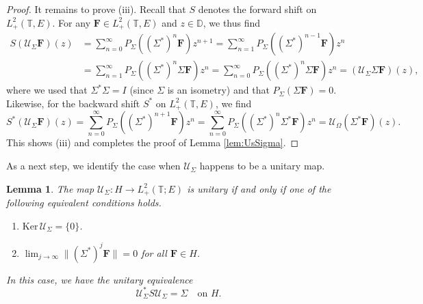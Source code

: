 \documentclass[10pt,reqno,a4paper]{amsart}
\newtheorem{lem}{Lemma}[section]
\theoremstyle{definition}
\theoremstyle{remark}
\theoremstyle{remark}
\numberwithin{equation}{section}
\newcommand{\T}{\mathbb{T}}
\newcommand{\D}{\mathbb{D}}
\renewcommand{\ker}{\mathrm{Ker}}
\newcommand{\Fb}{\mathbf{F}}
\newcommand{\id}{I}
\newcommand{\Om}{\Omega}
\newcommand{\Us}{\mathscr{U}}
\begin{document}
\begin{proof}
It remains to prove (iii). Recall that $S$ denotes the forward shift on $L^2_+(\T,E)$. For any $\Fb \in L^2_+(\T,E)$ and $z \in \D$, we thus find
\begin{align*}
S (\Us_\Sigma \Fb)(z) & = \sum_{n=0}^\infty P_\Sigma( (\Sigma^*)^n \Fb ) z^{n+1} = \sum_{n=1}^\infty P_\Sigma ( (\Sigma^*)^{n-1}  \Fb ) z^n \\
& = \sum_{n=1}^\infty P_\Sigma( (\Sigma^*)^n \Sigma \Fb ) z^n = \sum_{n=0}^\infty P_\Sigma((\Sigma^*)^n \Sigma \Fb) z^n = (\Us_\Sigma \Sigma \Fb)(z),
\end{align*}
where we used that $\Sigma^* \Sigma = \id$ (since $\Sigma$ is an isometry) and that $P_{\Sigma}( \Sigma \Fb) = 0$. Likewise, for the backward shift $S^*$ on $L^2_+(\T,E)$, we find
$$
S^* (\Us_\Sigma \Fb)(z) = \sum_{n=0}^\infty P_\Sigma((\Sigma^*)^{n+1} \Fb) z^n = \sum_{n=0}^\infty P_\Sigma ( (\Sigma^*)^n \Sigma^* \Fb) z^n =  \Us_\Om(\Sigma^* \Fb)(z).
$$
This shows (iii) and completes the proof of Lemma \ref{lem:UsSigma}.
\end{proof}



As a next step, we identify the case when $\Us_\Sigma$ happens to be a unitary map.

\begin{lem} \label{lem:UsSigma_unitary}
The map $\Us_\Sigma : H \to L^2_+(\T;E)$ is unitary if and only if one of the following equivalent conditions holds.
\begin{enumerate}
\item[(i)] $\ker \, \Us_\Sigma = \{ 0 \}$.
\item[(ii)] $\displaystyle \lim_{j \to \infty} \| (\Sigma^*)^j \Fb \| = 0$ for all $\Fb \in H$.
\end{enumerate}
In this case, we have the unitary equivalence
$$
\Us_\Sigma^* S \Us_\Sigma = \Sigma \quad \mbox{on $H$}.
$$
\end{lem}
\end{document}

